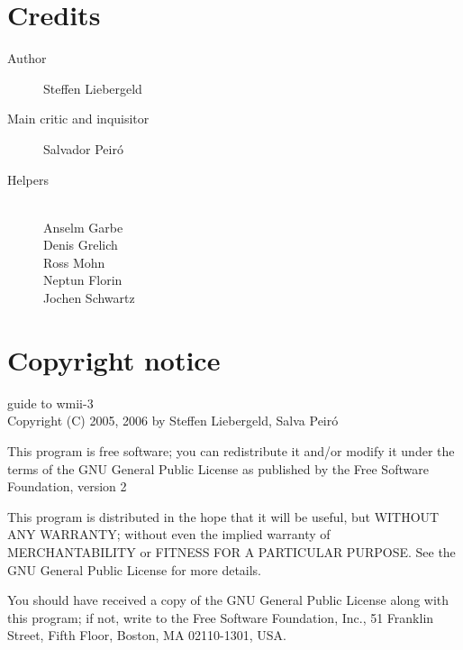 \documentclass[12pt,a4paper]{article} %
\begin{document}
\newpage

\section{Credits}
\label{sec:credits}


\begin{description}
\item [Author] Steffen Liebergeld
\item [Main critic and inquisitor] Salvador Peir\'o

\item [Helpers]
 \\
Anselm Garbe \\
Denis Grelich \\
Ross Mohn \\
Neptun Florin \\
Jochen Schwartz \\
\end{description}

\section{Copyright notice}

guide to wmii-3\\
Copyright (C) 2005, 2006 by Steffen Liebergeld, Salva Peir\'o

This program is free software; you can redistribute it and/or modify
it under the terms of the GNU General Public License as published by
the Free Software Foundation, version 2

This program is distributed in the hope that it will be useful, but
WITHOUT ANY WARRANTY; without even the implied warranty of
MERCHANTABILITY or FITNESS FOR A PARTICULAR PURPOSE.  See the GNU
General Public License for more details.

You should have received a copy of the GNU General Public License
along with this program; if not, write to the Free Software
Foundation, Inc., 51 Franklin Street, Fifth Floor, Boston, MA
02110-1301, USA.
\end{document}
